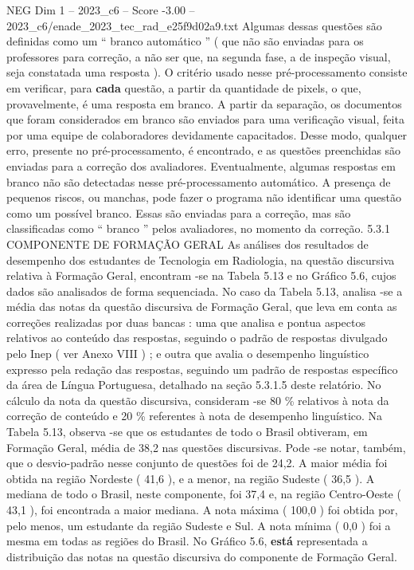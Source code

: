 \begin{textsample}{NEG Dim 1 – 2023\_c6 – Score -3.00 – 2023\_c6/enade\_2023\_tec\_rad\_e25f9d02a9.txt}
Algumas dessas questões são definidas como um “ branco automático ” ( que não são enviadas para os professores para correção, a não ser que, na segunda fase, a de inspeção visual, seja constatada uma resposta ).
O critério usado nesse pré-processamento consiste em verificar, para \textbf{cada} questão, a partir da quantidade de pixels, o que, provavelmente, é uma resposta em branco.
A partir da separação, os documentos que foram considerados em branco são enviados para uma verificação visual, feita por uma equipe de colaboradores devidamente capacitados.
Desse modo, qualquer erro, presente no pré-processamento, é encontrado, e as questões preenchidas são enviadas para a correção dos avaliadores.
Eventualmente, algumas respostas em branco não são detectadas nesse pré-processamento automático.
A presença de pequenos riscos, ou manchas, pode fazer o programa não identificar uma questão como um possível branco.
Essas são enviadas para a correção, mas são classificadas como “ branco ” pelos avaliadores, no momento da correção. 5.3.1 COMPONENTE DE FORMAÇÃO GERAL As análises dos resultados de desempenho dos estudantes de Tecnologia em Radiologia, na questão discursiva relativa à Formação Geral, encontram -se na Tabela 5.13 e no Gráfico 5.6, cujos dados são analisados de forma sequenciada.
No caso da Tabela 5.13, analisa -se a média das notas da questão discursiva de Formação Geral, que leva em conta as correções realizadas por duas bancas : uma que analisa e pontua aspectos relativos ao conteúdo das respostas, seguindo o padrão de respostas divulgado pelo Inep ( ver Anexo VIII ) ; e outra que avalia o desempenho linguístico expresso pela redação das respostas, seguindo um padrão de respostas específico da área de Língua Portuguesa, detalhado na seção 5.3.1.5 deste relatório.
No cálculo da nota da questão discursiva, consideram -se 80 \% relativos à nota da correção de conteúdo e 20 \% referentes à nota de desempenho linguístico.
Na Tabela 5.13, observa -se que os estudantes de todo o Brasil obtiveram, em Formação Geral, média de 38,2 nas questões discursivas.
Pode -se notar, também, que o desvio-padrão nesse conjunto de questões foi de 24,2.
A maior média foi obtida na região Nordeste ( 41,6 ), e a menor, na região Sudeste ( 36,5 ).
A mediana de todo o Brasil, neste componente, foi 37,4 e, na região Centro-Oeste ( 43,1 ), foi encontrada a maior mediana.
A nota máxima ( 100,0 ) foi obtida por, pelo menos, um estudante da região Sudeste e Sul.
A nota mínima ( 0,0 ) foi a mesma em todas as regiões do Brasil.
No Gráfico 5.6, \textbf{está} representada a distribuição das notas na questão discursiva do componente de Formação Geral.

\end{textsample}
